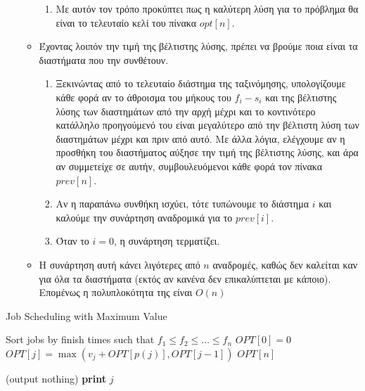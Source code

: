 \documentclass{article}
\begin{document}
\begin{enumerate}
\begin{itemize}
\begin{enumerate}[label=(\alph*)]
		\item Με αυτόν τον τρόπο προκύπτει πως η καλύτερη λύση για το πρόβλημα θα είναι το τελευταίο κελί του πίνακα $opt[n]$.
	\end{enumerate}
	\item Έχοντας λοιπόν την τιμή της βέλτιστης λύσης, πρέπει να βρούμε ποια είναι τα διαστήματα που την συνθέτουν. 
	\begin{enumerate}[label=(\alph*)]
			\item Ξεκινώντας από το τελευταίο διάστημα της ταξινόμησης, υπολογίζουμε κάθε φορά αν το άθροισμα του μήκους του $f_i - s_i$ και της βέλτιστης λύσης των διαστημάτων από την αρχή μέχρι και το κοντινότερο κατάλληλο προηγούμενό του είναι μεγαλύτερο από την βέλτιστη λύση των διαστημάτων μέχρι και πριν από αυτό. Με άλλα λόγια, ελέγχουμε αν η προσθήκη του διαστήματος αύξησε την τιμή της βέλτιστης λύσης, και άρα αν συμμετείχε σε αυτήν, συμβουλευόμενοι κάθε φορά τον πίνακα $prev[n]$.
			\item  Αν η παραπάνω συνθήκη ισχύει, τότε τυπώνουμε το διάστημα $i$ και καλούμε την συνάρτηση αναδρομικά για το $prev[i]$. 
			\item Όταν το $i = 0$, η συνάρτηση τερματίζει. 

	\end{enumerate}
	\item Η συνάρτηση αυτή κάνει λιγότερες από $n$ αναδρομές, καθώς δεν καλείται καν για όλα τα διαστήματα (εκτός αν κανένα δεν επικαλύπτεται με κάποιο). Επομένως η πολυπλοκότητα της είναι $Ο(n)$
\end{itemize}
\end{enumerate}

\begin{algorithm}[H]
\caption{Job Scheduling with Maximum Value}
\begin{algorithmic}[1]
    \State Sort jobs by finish times such that $f_1 \leq f_2 \leq \ldots \leq f_n$
        \State $OPT[0] = 0$
        \State $OPT[j] = \max(v_j + OPT[p(j)], OPT[j-1])$
    \EndFor
    \State \Return $OPT[n]$
\EndProcedure

        \State \Return (output nothing)
        \State \textbf{print} $j$
        \State {}
    \Else
        \State {}
    \EndIf
\EndProcedure
\end{algorithmic}
\end{algorithm}
\end{document}

